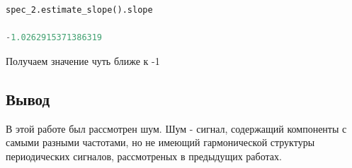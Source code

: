 \begin{lstlisting}[language=Python]
spec_2.estimate_slope().slope

-1.0262915371386319
\end{lstlisting}

Получаем значение чуть ближе к -1


\subsection{Вывод}

В этой работе был рассмотрен шум. Шум - сигнал, содержащий компоненты с самыми разными частотами, но не имеющий гармонической структуры периодических сигналов, рассмотреных в предыдущих работах.